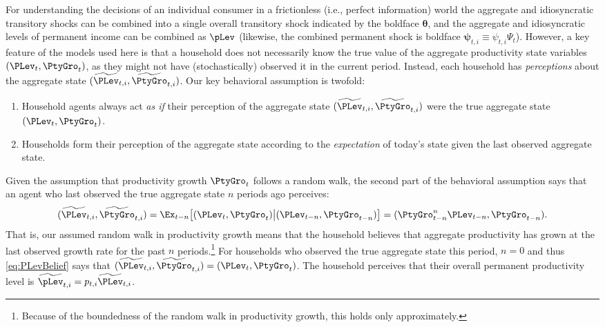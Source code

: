 \documentclass[titlepage]{\econtex}\newcommand{\texname}{cAndCwithStickyE}
\begin{document}
For understanding the decisions of an individual consumer in a frictionless (i.e., perfect information) world the aggregate and idiosyncratic transitory shocks can be combined into a single overall transitory shock indicated by the boldface $\pmb{\theta}$, and the aggregate and idiosyncratic levels of permanent income can be combined as $\pLev$ (likewise, the combined permanent shock is boldface $\pmb{\psi}_{t,i}\equiv \psi_{t,i} \Psi_{t}$).  However, a key feature of the models used here is that a household does not necessarily know the true value of the aggregate productivity state variables $(\PLev_t,\PtyGro_t)$, as they might not have (stochastically) observed it in the current period.  Instead, each household has \textit{perceptions} about the aggregate state $(\perc{\PLev}_{t,i},\perc{\PtyGro}_{t,i})$.  Our key behavioral assumption is twofold:
\begin{enumerate}
\item Household agents always act \textit{as if} their perception of the aggregate state $(\perc{\PLev}_{t,i},\perc{\PtyGro}_{t,i})$ were the true aggregate state $(\PLev_t,\PtyGro_t)$.

\item Households form their perception of the aggregate state according to the \textit{expectation} of today's state given the last observed aggregate state.
\end{enumerate}
Given the assumption that productivity growth $\PtyGro_t$ follows a random walk,
the second part of the behavioral assumption says that an agent who last observed the true
aggregate state $n$ periods ago perceives:
\begin{equation}\label{eq:PLevBelief}
(\perc{\PLev}_{t,i},\perc{\PtyGro}_{t,i}) = \Ex_{t-n}\big[(\PLev_t,\PtyGro_t) \big| (\PLev_{t-n},\PtyGro_{t-n})\big] = (\PtyGro_{t-n}^n \PLev_{t-n},\PtyGro_{t-n}).
\end{equation}
That is, our assumed random walk in productivity growth means that the household believes that aggregate productivity has grown at the last observed growth rate for the past $n$ periods.\footnote{Because of the boundedness of the random walk in productivity growth, this holds only approximately.}  For households who observed the true aggregate state this period, $n=0$ and thus \eqref{eq:PLevBelief} says that $(\perc{\PLev}_{t,i},\perc{\PtyGro}_{t,i}) = (\PLev_t,\PtyGro_t)$.  The household perceives that their overall permanent productivity level is $\perc{\pLev}_{t,i} = p_{t,i} \perc{\PLev}_{t,i}$.
\end{document}
